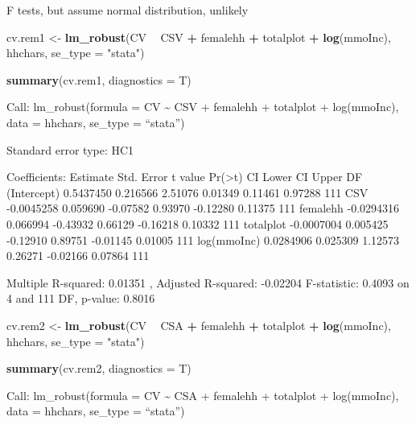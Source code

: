 \documentclass[
]{article}
\newenvironment{Shaded}{\begin{snugshade}}{\end{snugshade}}
\newcommand{\DataTypeTok}[1]{\textcolor[rgb]{0.13,0.29,0.53}{#1}}
\newcommand{\KeywordTok}[1]{\textcolor[rgb]{0.13,0.29,0.53}{\textbf{#1}}}
\newcommand{\NormalTok}[1]{#1}
\newcommand{\OperatorTok}[1]{\textcolor[rgb]{0.81,0.36,0.00}{\textbf{#1}}}
\newcommand{\StringTok}[1]{\textcolor[rgb]{0.31,0.60,0.02}{#1}}
\begin{document}
F tests, but assume normal distribution, unlikely

\begin{Shaded}
\begin{Highlighting}[]
\NormalTok{cv.rem1 <-}
\StringTok{  }\KeywordTok{lm_robust}\NormalTok{(CV }\OperatorTok{~}\StringTok{ }\NormalTok{CSV }\OperatorTok{+}\StringTok{ }\NormalTok{femalehh  }\OperatorTok{+}\StringTok{ }\NormalTok{totalplot }\OperatorTok{+}\StringTok{ }\KeywordTok{log}\NormalTok{(mmoInc), hhchars,}
            \DataTypeTok{se_type =} \StringTok{"stata"}\NormalTok{)}

\KeywordTok{summary}\NormalTok{(cv.rem1, }\DataTypeTok{diagnostics =}\NormalTok{ T)}
\end{Highlighting}
\end{Shaded}

Call: lm\_robust(formula = CV \textasciitilde{} CSV + femalehh +
totalplot + log(mmoInc), data = hhchars, se\_type = ``stata'')

Standard error type: HC1

Coefficients: Estimate Std. Error t value
Pr(\textgreater\textbar t\textbar) CI Lower CI Upper DF (Intercept)
0.5437450 0.216566 2.51076 0.01349 0.11461 0.97288 111 CSV -0.0045258
0.059690 -0.07582 0.93970 -0.12280 0.11375 111 femalehh -0.0294316
0.066994 -0.43932 0.66129 -0.16218 0.10332 111 totalplot -0.0007004
0.005425 -0.12910 0.89751 -0.01145 0.01005 111 log(mmoInc) 0.0284906
0.025309 1.12573 0.26271 -0.02166 0.07864 111

Multiple R-squared: 0.01351 , Adjusted R-squared: -0.02204 F-statistic:
0.4093 on 4 and 111 DF, p-value: 0.8016

\begin{Shaded}
\begin{Highlighting}[]
\NormalTok{cv.rem2 <-}
\StringTok{  }\KeywordTok{lm_robust}\NormalTok{(CV }\OperatorTok{~}\StringTok{ }\NormalTok{CSA }\OperatorTok{+}\StringTok{ }\NormalTok{femalehh  }\OperatorTok{+}\StringTok{ }\NormalTok{totalplot }\OperatorTok{+}\StringTok{ }\KeywordTok{log}\NormalTok{(mmoInc), hhchars,}
            \DataTypeTok{se_type =} \StringTok{"stata"}\NormalTok{)}

\KeywordTok{summary}\NormalTok{(cv.rem2, }\DataTypeTok{diagnostics =}\NormalTok{ T)}
\end{Highlighting}
\end{Shaded}

Call: lm\_robust(formula = CV \textasciitilde{} CSA + femalehh +
totalplot + log(mmoInc), data = hhchars, se\_type = ``stata'')
\end{document}
